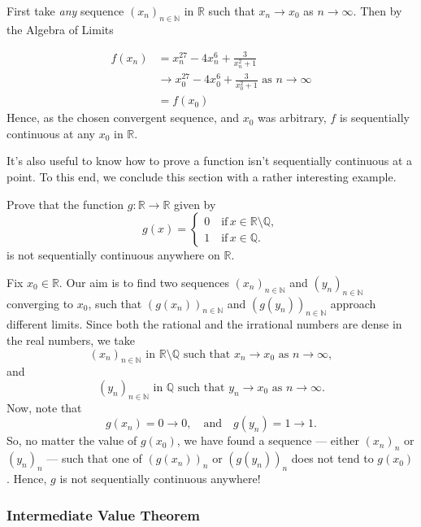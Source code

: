 \documentclass[
  17pt,
  a4paper]{extarticle}
\theoremstyle{plain}
\theoremstyle{plain}
\theoremstyle{plain}
\theoremstyle{plain}
\theoremstyle{plain}
\theoremstyle{definition}
\theoremstyle{definition}
\theoremstyle{definition}
\theoremstyle{remark}
\let\BeginKnitrBlock\begin \let\EndKnitrBlock\end
\renewcommand{\;}{\,}
\begin{document}
\BeginKnitrBlock{solution*}
First take \emph{any} sequence \((x_n)_{n\in\mathbb{N}}\) in \(\mathbb{R}\) such that \(x_n \to x_0\) as \(n \to \infty\). Then by the Algebra of Limits

\begin{align*}
f(x_n) &= x_n^{27} - 4x_n^{6} + \frac{3}{x_n^2 +1}\\
&\to x_0^{27} - 4x_0^6 + \frac{3}{x_0^2 + 1}\; \; \text{as $n \to \infty$}\\
& = f(x_0) 
\end{align*}
Hence, as the chosen convergent sequence, and \(x_0\) was arbitrary, \(f\) is sequentially continuous at any \(x_0\) in \(\mathbb{R}\).
\EndKnitrBlock{solution*}

It's also useful to know how to prove a function isn't sequentially continuous at a point. To this end, we conclude this section with a rather interesting example.
\BeginKnitrBlock{example}
{\label{exm:ex2} }Prove that the function \(g: \mathbb{R} \to \mathbb{R}\) given by \[g(x) = \begin{cases}
0 \quad \text{if} \; x \in \mathbb{R}\setminus\mathbb{Q},\\
1 \quad \text{if} \; x \in \mathbb{Q}.
\end{cases}\] is not sequentially continuous anywhere on \(\mathbb{R}\).
\EndKnitrBlock{example}

\BeginKnitrBlock{solution*}
Fix \(x_0 \in \mathbb{R}\). Our aim is to find two sequences \((x_n)_{n\in\mathbb{N}}\) and \((y_n)_{n\in\mathbb{N}}\) converging to \(x_0\), such that \(\left(g(x_n)\right)_{n\in\mathbb{N}}\) and \(\left(g(y_n)\right)_{n\in\mathbb{N}}\) approach different limits. Since both the rational and the irrational numbers are dense in the real numbers, we take \[(x_n)_{n\in\mathbb{N}}\;\; \text{in}\;\; \mathbb{R}\setminus\mathbb{Q} \;\; \text{such that} \;\; x_n \to x_0 \;\; \text{as}\;\; n \to \infty,\] and \[(y_n)_{n\in\mathbb{N}}\;\; \text{in}\;\; \mathbb{Q} \;\; \text{such that} \;\; y_n \to x_0 \;\; \text{as}\;\; n \to \infty.\] Now, note that \[g(x_n) = 0 \to 0, \quad \text{and} \quad g(y_n) = 1 \to 1.\] So, no matter the value of \(g(x_0)\), we have found a sequence --- either \((x_n)_n\) or \((y_n)_n\) --- such that one of \(\left(g(x_n)\right)_n\) or \(\left(g(y_n)\right)_n\) does not tend to \(g(x_0)\). Hence, \(g\) is not sequentially continuous anywhere!
\EndKnitrBlock{solution*}

\hypertarget{intermediate-value-theorem}{%
\subsubsection{Intermediate Value Theorem}\label{intermediate-value-theorem}}
\end{document}
